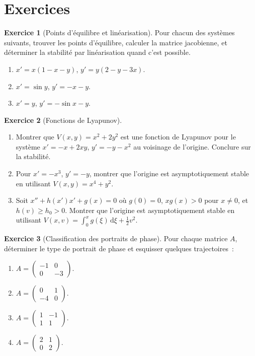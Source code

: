 \documentclass[12pt,a4paper,openany]{book}
\theoremstyle{definition}
\newtheorem{exercice}{Exercice}[chapter]
\theoremstyle{plain}
\theoremstyle{remark}
\newcommand{\dd}{\mathrm{d}}
\begin{document}
\section{Exercices}\label{sec:exo-stabilite}

\begin{exercice}[Points d'équilibre et linéarisation]\label{exo:equil-lin}
  Pour chacun des systèmes suivants, trouver les points d'équilibre,
  calculer la matrice jacobienne, et déterminer la stabilité par
  linéarisation quand c'est possible.
  \begin{enumerate}[label=\alph*)]
    \item $x'=x(1-x-y)$, $y'=y(2-y-3x)$.
    \item $x'=\sin y$, $y'=-x-y$.
    \item $x'=y$, $y'=-\sin x-y$.
  \end{enumerate}
\end{exercice}

\begin{exercice}[Fonctions de Lyapunov]\label{exo:lyapunov}
  \begin{enumerate}[label=\alph*)]
    \item Montrer que $V(x,y)=x^2+2y^2$ est une fonction de Lyapunov
      pour le système $x'=-x+2xy$, $y'=-y-x^2$ au voisinage de
      l'origine. Conclure sur la stabilité.
    \item Pour $x'=-x^3$, $y'=-y$, montrer que l'origine est
      asymptotiquement stable en utilisant $V(x,y)=x^4+y^2$.
    \item Soit $x''+h(x')x'+g(x)=0$ où $g(0)=0$, $xg(x)>0$ pour
      $x\neq 0$, et $h(v)\geq h_0>0$. Montrer que l'origine est
      asymptotiquement stable en utilisant
      $V(x,v)=\int_0^x g(\xi)\,\dd\xi+\frac{1}{2}v^2$.
  \end{enumerate}
\end{exercice}

\begin{exercice}[Classification des portraits de phase]\label{exo:classif-phase}
  Pour chaque matrice $A$, déterminer le type de portrait de phase et
  esquisser quelques trajectoires~:
  \begin{enumerate}[label=\alph*)]
    \item $A=\begin{pmatrix}-1&0\\0&-3\end{pmatrix}$.
    \item $A=\begin{pmatrix}0&1\\-4&0\end{pmatrix}$.
    \item $A=\begin{pmatrix}1&-1\\1&1\end{pmatrix}$.
    \item $A=\begin{pmatrix}2&1\\0&2\end{pmatrix}$.
  \end{enumerate}
\end{exercice}
\end{document}
